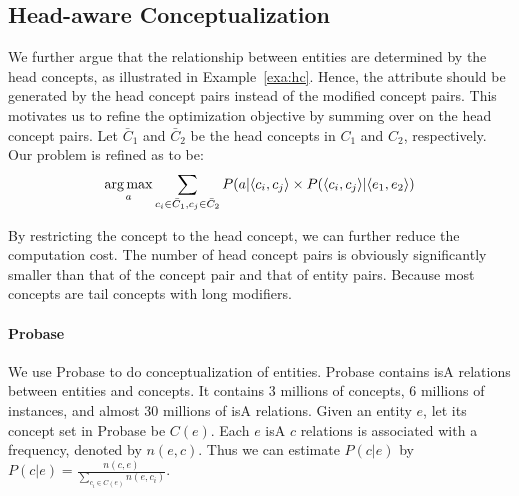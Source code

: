 \subsection{Head-aware Conceptualization}
We further argue that the relationship between entities are determined by the head concepts, as illustrated in Example~\ref{exa:hc}.
Hence, the attribute should be generated by the head concept pairs instead of the modified concept pairs.
This motivates us to refine the optimization objective by summing over on the head concept pairs.
Let $\bar{C}_1$ and $\bar{C}_2$ be the head concepts in  $C_1$ and $C_2$, respectively.
Our problem is refined as to be:
\begin{equation}
\label{eq:target_head}
\small
\argmax_a \sum_{c_i\in \bar{C}_1 , c_j \in \bar{C}_2 } P(a|\langle c_{i},c_{j} \rangle \times P(\langle c_{i},c_{j}\rangle|\langle e_{1},e_{2}\rangle)
\end{equation}

By restricting the concept to the head concept, we can further reduce the computation cost.
The number of head concept pairs is obviously significantly smaller than that of the concept pair and that of entity pairs.
Because most concepts are tail concepts with long modifiers.
\paragraph*{Probase}
We use Probase to do conceptualization of entities. 
Probase contains isA relations between entities and concepts. It contains 3 millions of concepts, 6 millions of instances, and almost 30 millions of isA relations.
Given an entity $e$, let its concept set in Probase be $C(e)$.
Each $e$ isA $c$ relations is associated with a frequency, denoted by $n(e, c)$.
Thus we can estimate  $P(c|e)$ by
$P(c|e)=\frac{n(c,e)}{\sum_{c_i\in C(e)}n(e, c_i)}$.

